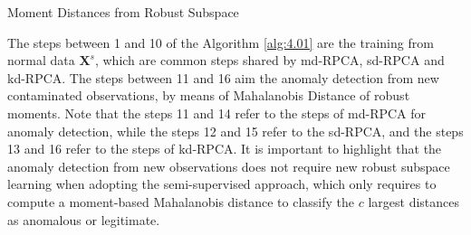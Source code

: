 \begin{algorithm}
	\label{alg:4.01}
	\caption{Moment Distances from Robust Subspace}
\end{algorithm}

The steps between 1 and 10 of the Algorithm \ref{alg:4.01} are the training from normal data $\pmb{X}^s$, which are common steps shared by md-RPCA, sd-RPCA and kd-RPCA. The steps between 11 and 16 aim the anomaly detection from new contaminated observations, by means of Mahalanobis Distance of robust moments. Note that the steps 11 and 14 refer to the steps of md-RPCA for anomaly detection, while the steps 12 and 15 refer to the sd-RPCA, and the steps 13 and 16 refer to the steps of kd-RPCA. It is important to highlight that the anomaly detection from new observations does not require new robust subspace learning when adopting the semi-supervised approach, which only requires to compute a moment-based Mahalanobis distance to classify the $c$ largest distances as anomalous or legitimate.

